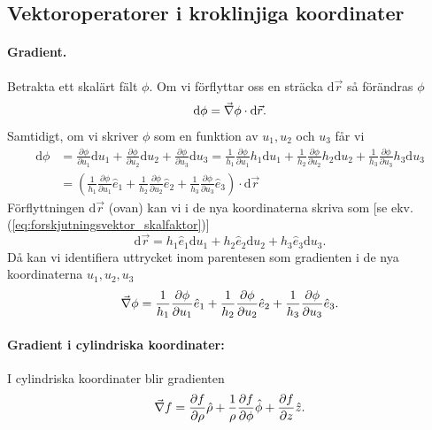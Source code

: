 \documentclass[%
oneside,                 %
final,                   %
10pt]{article}
\begin{document}
\subsection*{Vektoroperatorer i kroklinjiga koordinater}

\paragraph{Gradient.}
Betrakta ett skalärt fält $\phi$.  Om vi förflyttar oss en sträcka $\mbox{d}\vec{r}$ så förändras $\phi$ 
\begin{equation}
  \mbox{d}\phi = \vec{\nabla} \phi \cdot \mbox{d}\vec{r}.
\end{equation}
Samtidigt, om vi skriver $\phi$ som en funktion av $u_1, u_2$ och $u_3$ får vi
\begin{align}
  \mbox{d}\phi &= \frac{\partial \phi}{\partial u_1}\mbox{d}u_1 + 
\frac{\partial \phi}{\partial u_2}\mbox{d}u_2 +
\frac{\partial \phi}{\partial u_3}\mbox{d}u_3 =
\frac{1}{h_1} \frac{\partial \phi}{\partial u_1} h_1 \mbox{d}u_1 +
\frac{1}{h_2} \frac{\partial \phi}{\partial u_2} h_2 \mbox{d}u_2 +
\frac{1}{h_3} \frac{\partial \phi}{\partial u_3} h_3 \mbox{d}u_3 \nonumber \\ 
 &=
\left(\frac{1}{h_1} \frac{\partial \phi}{\partial u_1} \hat{e}_1 +
\frac{1}{h_2} \frac{\partial \phi}{\partial u_2} \hat{e}_2 +
\frac{1}{h_3} \frac{\partial \phi}{\partial u_3} \hat{e}_3\right) \cdot 
\mbox{d}\vec{r}
\end{align}
Förflyttningen $\mbox{d}\vec{r}$ (ovan) kan vi i de nya koordinaterna skriva som [se ekv. (\ref{eq:forskjutningsvektor_skalfaktor})]
\begin{equation}
  \mbox{d}\vec{r} = h_1 \hat{e}_1 \mbox{d}u_1 + h_2 \hat{e}_2 \mbox{d}u_2
+ h_3 \hat{e}_3 \mbox{d}u_3.
\end{equation}
Då kan vi identifiera uttrycket inom parentesen som gradienten i de nya koordinaterna $u_1, u_2, u_3$
\begin{equation}
  \vec{\nabla} \phi = \frac{1}{h_1} \frac{\partial \phi}{\partial u_1} \hat{e}_1
+ \frac{1}{h_2}
\frac{\partial \phi}{\partial u_2} \hat{e}_2 
+ \frac{1}{h_3} \frac{\partial \phi}{\partial u_3} \hat{e}_3.
\end{equation}

\paragraph{Gradient i cylindriska koordinater:}
I cylindriska koordinater blir gradienten
\begin{equation}
  \vec{\nabla} f = \frac{\partial f}{\partial \rho} \hat{\rho} + \frac{1}{\rho}
\frac{\partial f}{\partial \phi} \hat{\phi} + \frac{\partial f}{\partial z} \hat{z}.
\end{equation}
\end{document}

